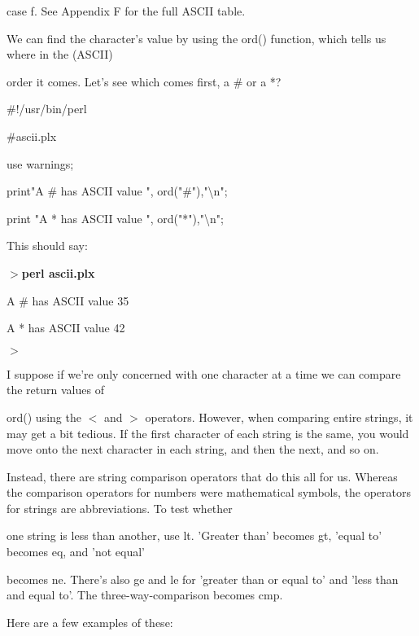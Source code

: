 \documentclass[a4paper,11pt]{book}
\begin{document}
\noindent case f. See Appendix F for the full ASCII table.

\noindent 

\noindent We can find the character's value by using the ord() function, which tells us where in the (ASCII)

\noindent order it comes. Let's see which comes first, a \# or a *?

\noindent 

\noindent \#!/usr/bin/perl

\noindent \#ascii.plx

\noindent use warnings;

\noindent print"A \# has ASCII value ", ord("\#"),"\textbackslash n";

\noindent print "A * has ASCII value ", ord("*"),"\textbackslash n";

\noindent 

\noindent 

\noindent This should say:

\noindent 

\noindent $>$\textbf{perl ascii.plx}

\noindent A \# has ASCII value 35

\noindent A * has ASCII value 42

\noindent $>$

\noindent 

\noindent I suppose if we're only concerned with one character at a time we can compare the return values of

\noindent ord() using the $<$ and $>$ operators. However, when comparing entire strings, it may get a bit tedious. If the first character of each string is the same, you would move onto the next character in each string, and then the next, and so on.

\noindent 

\noindent Instead, there are string comparison operators that do this all for us. Whereas the comparison operators for numbers were mathematical symbols, the operators for strings are abbreviations. To test whether

\noindent one string is less than another, use lt. 'Greater than' becomes gt, 'equal to' becomes eq, and 'not equal'

\noindent becomes ne. There's also ge and le for 'greater than or equal to' and 'less than and equal to'. The three-way-comparison becomes cmp.

\noindent 

\noindent Here are a few examples of these:
\end{document}
